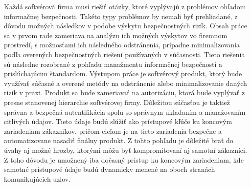 \newpage
\thispagestyle{plain}

Každá softvérová firma musí riešiť otázky, ktoré vyplývajú z problémov ohľadom informačnej bezpečnosti.
Takéto typy problémov by nemali byť prehliadané, z dôvodu možných následkov v podobe výskytu bezpečnostných rizík.
Obsah práce sa v prvom rade zameriava na analýzu ich možných výskytov vo firemnom prostredí, s možnosťami ich následného
odstránenia, prípadne minimalizovania podľa overených bezpečnostných riešení používaných v súčasnosti.
Tieto riešenia sú následne rozobrané z pohľadu manažmentu informačnej bezpečnosti a prislúchajúcim štandardom.
Výstupom práce je softvérový produkt, ktorý bude využívať súčasné a overené metódy na odstránenie alebo minimalizovanie
daných rizík v praxi.
Produkt sa bude zameriavať na autorizáciu, ktorá bude vyplývať z presne stanovenej hierarchie softvérovej firmy.
Dôležitou súčasťou je taktiež správna a bezpečná autentifikácia spolu so správnym ukladaním a manažovaním citlivých údajov.
Tieto údaje budú slúžiť ako prístupové kľúče ku koncovým zariadeniam zákazníkov, pričom cieľom je na tieto zariadenia
bezpečne a automatizovane nasadiť finálny produkt.
Z tohto pohľadu je dôležité brať do úvahy aj možné hrozby, ktorými môžu byť kompromitovaní aj samotní zákazníci.
Z toho dôvodu je umožnený iba dočasný prístup ku koncovým zariadeniam, kde samotné prístupové údaje budú dynamicky
menené na oboch stranách komunikujúcich uzlov.
\emptypage

